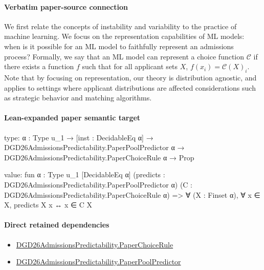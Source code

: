 \documentclass[10pt]{article}
\begin{document}
\paragraph{Verbatim paper-source connection}
\begin{ReviewVerbatim}
We first relate the concepts of instability and variability to the practice of machine learning.
We focus on the representation capabilities of ML models: when is it possible for an ML model to faithfully represent an admissions process?
Formally, we say that an ML model can represent a choice function $\mathcal C$ if there exists a function $f$ such that for all applicant sets $X$, $f(x_i) = \mathcal C(X)_i$.
{Note that by focusing on representation, our theory is distribution agnostic, and applies to settings where applicant distributions are affected considerations such as strategic behavior and matching algorithms.}
\end{ReviewVerbatim}



\paragraph{Lean-expanded paper semantic target}
\begin{ReviewVerbatim}
type:
{α : Type u_1} →
  [inst : DecidableEq α] →
    DGD26AdmissionsPredictability.PaperPoolPredictor α → DGD26AdmissionsPredictability.PaperChoiceRule α → Prop

value:
fun {α : Type u_1} [DecidableEq α] (predicts : DGD26AdmissionsPredictability.PaperPoolPredictor α)
    (C : DGD26AdmissionsPredictability.PaperChoiceRule α) =>
  ∀ (X : Finset α), ∀ x ∈ X, predicts X x ↔ x ∈ C X
\end{ReviewVerbatim}

\paragraph{Direct retained dependencies}
\begin{itemize}\raggedright
\item \hyperlink{governing-declaration-4678951b4432b184}{DGD26\allowbreak{}Admissions\allowbreak{}Predictability.\allowbreak{}Paper\allowbreak{}Choice\allowbreak{}Rule}
\item \hyperlink{governing-declaration-b65ec685579c2dd7}{DGD26\allowbreak{}Admissions\allowbreak{}Predictability.\allowbreak{}Paper\allowbreak{}Pool\allowbreak{}Predictor}
\end{itemize}
\end{document}
